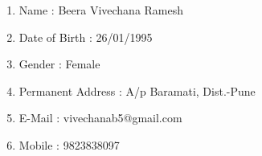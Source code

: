 \documentclass[11pt,fleqn]{book} %
\begin{document}
\newpage
\begin{enumerate}
\begingroup
\thispagestyle{empty}
\par\normalfont\fontsize{20}{15}\sffamily\selectfont\color{white}
\vspace*{2cm}
    \item Name : Beera Vivechana Ramesh\\[0.5cm]
    \item Date of Birth : 26/01/1995\\[0.5cm]
    \item Gender : Female\\[0.5cm] 
    \item Permanent Address : A/p Baramati, Dist.-Pune\\[0.5cm]
    \item E-Mail : vivechanab5@gmail.com\\[0.5cm]
    \item Mobile : 9823838097
\end{enumerate}
\endgroup
\end{document}
